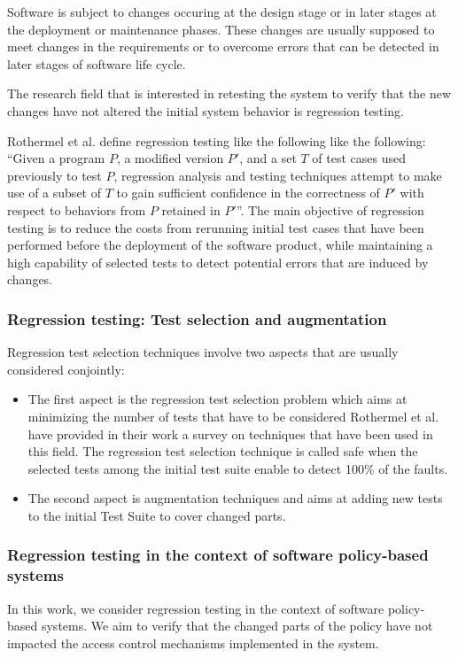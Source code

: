 Software is subject to changes occuring at the design stage or in later stages at the deployment or maintenance phases. These changes are 
usually supposed to meet changes in the requirements or to overcome errors that can be detected in later stages of software life cycle. 

The research field that is interested in retesting the system to verify that the new changes have not altered the initial system behavior is regression testing. 

Rothermel et al. \cite{Rothermel:1996:ART:235681.235682} define regression testing like the following 
like the following: ``Given a program $P$, a modified version $P'$, and a set $T$ of test cases used previously to test $P$, regression analysis and testing 
techniques attempt to make use of a subset of $T$ to gain sufficient confidence in the correctness of $P'$ with respect to behaviors from $P$ retained in $P'$''.
The main objective of regression testing is to reduce the costs from rerunning initial test cases that have been performed before the deployment 
of the software product, while maintaining a high capability of selected tests to detect potential errors that are induced by changes.


\subsubsection{Regression testing: Test selection and augmentation}
Regression test selection techniques involve two aspects that are usually considered conjointly:
\begin{itemize}
\item The first aspect is the regression test selection problem which aims at minimizing the number of tests that have to be considered 
Rothermel et al. \cite{Rothermel:1996:ART:235681.235682} have provided in their work a survey on techniques that have been used in this field. 
The regression test selection technique is called safe when the selected tests among the initial test suite enable to detect 100\% of the faults.
\item The second aspect is augmentation techniques and aims at adding new tests to the initial Test Suite to cover changed parts.
\end{itemize}

\subsubsection{Regression testing in the context of software policy-based systems}

In this work, we consider regression testing in the context of software policy-based systems. We aim to verify that the changed parts of the policy have not 
impacted the access control mechanisms implemented in the system.







